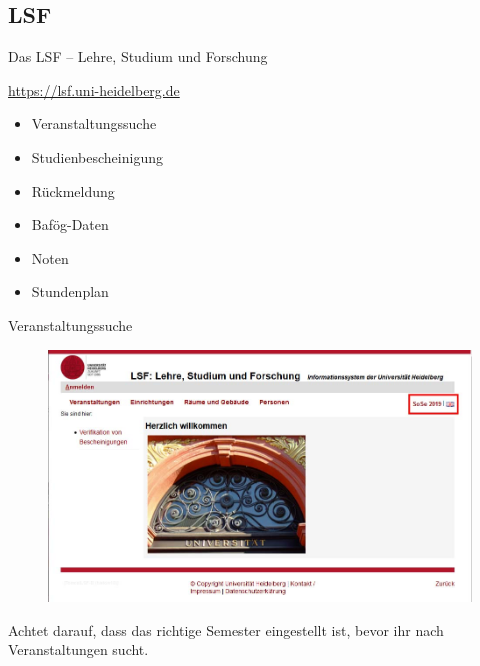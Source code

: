 \subsection{LSF}
\begin{frame}{Das LSF -- Lehre, Studium und Forschung}

    \url{https://lsf.uni-heidelberg.de}

    \begin{center}
    \end{center}

    \begin{itemize}
        \item{Veranstaltungssuche}
        \item{Studienbescheinigung}
        \item{Rückmeldung}
        \item{Bafög-Daten}
        \item{Noten}
        \item{Stundenplan}
    \end{itemize}
\end{frame}

\begin{frame}{Veranstaltungssuche}
    \begin{figure}
        \centering
        \includegraphics[scale=0.3]{images/lsf01.jpg}
    \end{figure}
Achtet darauf, dass das richtige Semester eingestellt ist, bevor ihr nach Veranstaltungen sucht.
\end{frame}

